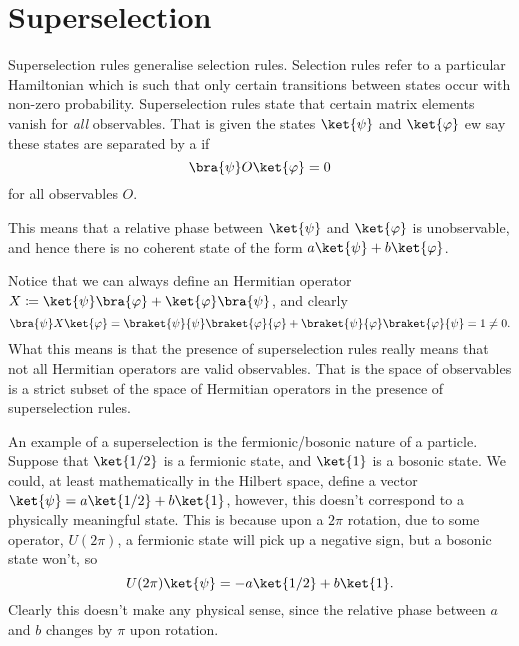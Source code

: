 \documentclass[fleqn]{NotesClass}
\begin{document}
    \section{Superselection}
    Superselection rules generalise selection rules.
    Selection rules refer to a particular Hamiltonian which is such that only certain transitions between states occur with non-zero probability.
    Superselection rules state that certain matrix elements vanish for \emph{all} observables.
    That is given the states \(\ket{\psi}\) and \(\ket{\varphi}\) ew say these states are separated by a  if
    \begin{equation}
        \bra{\psi} O \ket{\varphi} = 0
    \end{equation}
    for all observables \(O\).
    
    This means that a relative phase between \(\ket{\psi}\) and \(\ket{\varphi}\) is unobservable, and hence there is no coherent state of the form \(a\ket{\psi} + b\ket{\varphi}\).
    
    Notice that we can always define an Hermitian operator \(X \coloneqq \ket{\psi}\bra{\varphi} + \ket{\varphi}\bra{\psi}\), and clearly
    \begin{equation}
        \bra{\psi}X\ket{\varphi} = \braket{\psi}{\psi}\braket{\varphi}{\varphi} + \braket{\psi}{\varphi}\braket{\varphi}{\psi} = 1 \ne 0.
    \end{equation}
    What this means is that the presence of superselection rules really means that not all Hermitian operators are valid observables.
    That is the space of observables is a strict subset of the space of Hermitian operators in the presence of superselection rules.
    
    An example of a superselection is the fermionic/bosonic nature of a particle.
    Suppose that \(\ket{1/2}\) is a fermionic state, and \(\ket{1}\) is a bosonic state.
    We could, at least mathematically in the Hilbert space, define a vector \(\ket{\psi} = a\ket{1/2} + b\ket{1}\), however, this doesn't correspond to a physically meaningful state.
    This is because upon a \(2\pi\) rotation, due to some operator, \(U(2\pi)\), a fermionic state will pick up a negative sign, but a bosonic state won't, so
    \begin{equation}
        U(2\pi)\ket{\psi} = -a\ket{1/2} + b\ket{1}.
    \end{equation}
    Clearly this doesn't make any physical sense, since the relative phase between \(a\) and \(b\) changes by \(\pi\) upon rotation.
    
\end{document}
